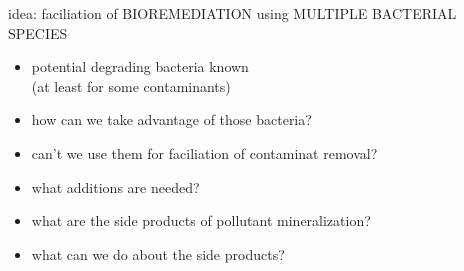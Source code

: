\documentclass[style=ufz]{powerdot}
\begin{document}
\begin{slide}{idea: faciliation of BIOREMEDIATION using MULTIPLE BACTERIAL SPECIES}
\begin{itemize}
 \item potential degrading bacteria known\\ (at least for some contaminants)\newline\pause
 \item how can we take advantage of those bacteria?\newline\pause
 \item can't we use them for faciliation of contaminat removal?\newline\pause
 \item what additions are needed?\newline\pause
 \item what are the side products of pollutant mineralization?\newline\pause
 \item what can we do about the side products?
\end{itemize}
\end{slide}
\end{document}

